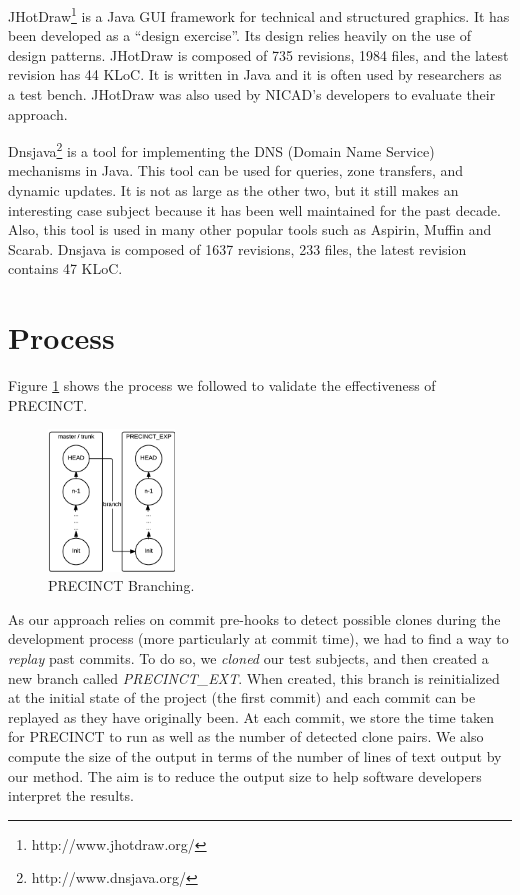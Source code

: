 JHotDraw\footnote{http://www.jhotdraw.org/} is a Java GUI framework for technical and structured graphics.
It has been developed as a ``design exercise''. Its design relies heavily on the use of design patterns. JHotDraw is composed of 735 revisions, 1984 files, and the latest revision has 44 KLoC. It is written in Java and it is often used by researchers as a test bench. JHotDraw was also used by NICAD's developers to evaluate their approach.

Dnsjava\footnote{http://www.dnsjava.org/} is a tool for implementing the DNS (Domain Name Service) mechanisms in Java.
This tool can be used for queries, zone transfers, and dynamic updates.
It is not as large as the other two, but it still makes an interesting case subject because it has been well maintained for the past decade. Also, this tool is used in many other popular tools such as Aspirin, Muffin and
Scarab. Dnsjava is composed of 1637 revisions, 233 files, the latest revision contains 47 KLoC.

\section{Process}
\label{sub:Process}


Figure \ref{fig:precinct-branching} shows the process we followed to validate the effectiveness of PRECINCT.

\begin{figure}
  \centering
    \includegraphics[width=0.3\textwidth]{media/branch.png}
    \caption{PRECINCT Branching.\label{fig:precinct-branching}}
\end{figure}

As our approach relies on commit pre-hooks to detect possible clones during the development process (more particularly at commit time), we had to find a way to \textit{replay} past commits. To do so, we  \textit{cloned} our test subjects, and then created a new branch called \textit{PRECINCT\_EXT}.
When created, this branch is reinitialized at the initial state of the project (the first commit) and each commit can be replayed as they have originally been. At each commit, we store the time taken for PRECINCT to run as well as the number of detected clone pairs. We also compute the size of the output in terms of the number of lines of text output by our method. The aim is to reduce the output size to help software developers interpret the results.

